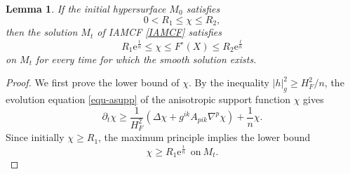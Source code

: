 \documentclass[10pt,a4paper]{amsart}
\newtheorem{lemma}[proposition]{Lemma}
\numberwithin{equation}{section}
\begin{document}
	\begin{lemma}
		\label{lem-anisosupp}
		If the initial hypersurface $M_0$ satisfies
		\begin{equation*}
			0 < R_1 \leq \chi \leq R_2,
		\end{equation*}
		then the solution $M_t$ of IAMCF \eqref{IAMCF} satisfies
		\begin{equation}
			\label{equ-asest}
			R_1 \mathrm{e}^{\frac{t}{n}} \leq \chi \leq F^{\circ}(X) \leq R_2 \mathrm{e}^{\frac{t}{n}}
		\end{equation}
		on $M_t$ for every time for which the smooth solution exists.
	\end{lemma}
	
	\begin{proof}
		We first prove the lower bound of $\chi$. By the inequality $|h|_{g}^2\geq {H_F^2}/{n}$,  the evolution equation \eqref{equ-asupp} of the anisotropic support function $\chi$ gives
		\begin{equation*}
			\partial_t \chi \geq \dfrac{1}{H_F^2}\left( \Delta \chi + g^{ik}A_{pik}\nabla^p \chi \right) + \dfrac{1}{n} \chi.
		\end{equation*}
		Since initially $\chi\geq R_1$, the maximum principle implies the lower bound
		\begin{equation*}
			\chi\geq R_1\mathrm{e}^{\frac{t}{n}}\ \ \mbox{on}\  M_t.
		\end{equation*}
		

\end{proof}
\end{document}
